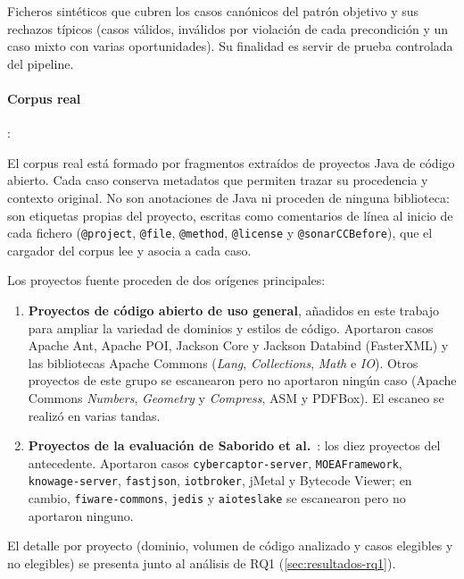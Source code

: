 Ficheros sintéticos que cubren los casos canónicos del patrón objetivo y
sus rechazos típicos (casos válidos, inválidos por violación de cada
precondición y un caso mixto con varias oportunidades). Su finalidad es
servir de prueba controlada del pipeline.

\paragraph{Corpus real}:

El corpus real está formado por fragmentos extraídos de proyectos Java de código abierto. Cada caso conserva metadatos que permiten trazar su procedencia y contexto original. No son anotaciones de Java ni proceden de ninguna biblioteca: son etiquetas propias del proyecto, escritas como comentarios de línea al inicio de cada fichero (\lstinline|@project|, \lstinline|@file|, \lstinline|@method|, \lstinline|@license| y \lstinline|@sonarCCBefore|), que el cargador del corpus lee y asocia a cada caso.

Los proyectos fuente proceden de dos orígenes principales:

\begin{enumerate}
    \item \textbf{Proyectos de código abierto de uso general}, añadidos en este trabajo para ampliar la
    variedad de dominios y estilos de código. Aportaron casos Apache Ant,
    Apache POI, Jackson Core y Jackson Databind (FasterXML) y las bibliotecas
    Apache Commons (\emph{Lang}, \emph{Collections}, \emph{Math} e \emph{IO}).
    Otros proyectos de este grupo se escanearon pero no aportaron ningún caso
    (Apache Commons \emph{Numbers}, \emph{Geometry} y \emph{Compress}, ASM y
    PDFBox). El escaneo se realizó en varias tandas.

    \item \textbf{Proyectos de la evaluación de Saborido et
    al.}~\cite{10.1109/ACCESS.2022.3144743}: los diez proyectos del antecedente.
    Aportaron casos \texttt{cybercaptor-server}, \texttt{MOEAFramework},
    \texttt{knowage-server}, \texttt{fastjson}, \texttt{iotbroker}, jMetal y
    Bytecode Viewer; en cambio, \texttt{fiware-commons}, \texttt{jedis} y
    \texttt{aioteslake} se escanearon pero no aportaron ninguno.
\end{enumerate}

El detalle por proyecto (dominio, volumen de código analizado y casos
elegibles y no elegibles) se presenta junto al análisis de RQ1
(\autoref{sec:resultados-rq1}).

